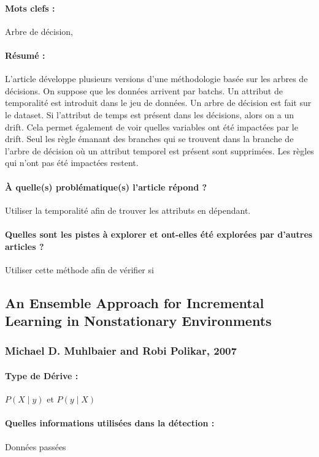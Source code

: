\documentclass[11pt,a4paper]{report}
\begin{document}
\paragraph{Mots clefs :} Arbre de décision, 

\paragraph{Résumé :} L'article développe plusieurs versions d'une méthodologie basée sur les arbres de décisions.  On suppose que les données arrivent par batchs. Un attribut de temporalité est introduit dans le jeu de données. Un arbre de décision est fait sur le dataset. Si l’attribut de temps est présent dans les décisions, alors on a un drift. Cela permet également de voir quelles variables ont été impactées par le drift. Seul les règle émanant des branches qui se trouvent dans la branche de l’arbre de décision où un attribut temporel est présent sont supprimées. Les règles qui n’ont pas été impactées restent.

\paragraph{À quelle(s) problématique(s) l'article répond ?} Utiliser la temporalité afin de trouver les attributs en dépendant.

\paragraph{Quelles sont les pistes à explorer et ont-elles  été explorées par d'autres articles ?} Utiliser cette méthode afin de vérifier si 








\subsection{An Ensemble Approach for Incremental Learning in Nonstationary Environments}
\subsubsection{Michael D. Muhlbaier and Robi Polikar, 2007}

\paragraph{Type de Dérive :} $P(X\mid y)$ et $P(y \mid X)$
\paragraph{Quelles informations utilisées dans la détection :} Données passées
\end{document}
